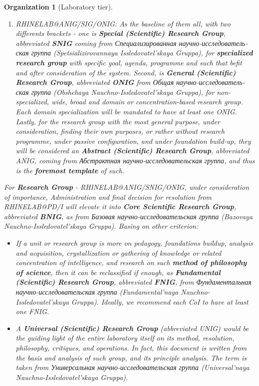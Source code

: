 \documentclass[10pt,a4paper]{article}
\newtheorem{org}{Organization}[section]
\begin{document}
\begin{org}[Laboratory tier]
\begin{enumerate}[topsep=1pt,itemsep=1pt]
        \item \textsf{RHINELAB@ANIG/SIG/ONIG}: As the baseline of them all, with two differents brackets - one is \textbf{Special (Scientific) Research Group}, abbreviated \textbf{SNIG} coming from \foreignlanguage{russian}{Специализированная научно-исследовательская группа} (Spetsializirovannaya Issledovatel'skaya Gruppa), for \textbf{specialized research group} with specific goal, agenda, programme and such that befit and after consideration of the system. Second, is \textbf{General (Scientific) Research Group}, abbreviated \textbf{ONIG} from \foreignlanguage{russian}{Общая научно-исследовательская группа} (Obshchaya Nauchno-Issledovatel'skaya Gruppa), for non-specialized, wide, broad and domain or concentration-based research group. Each domain specialization will be mandated to have at least one ONIG. Lastly, for the research group with the most general purpose, under consideration, finding their own purposes, or rather without research programme, under passive configuration, and under foundation build-up, they will be considered an \textbf{Abstract (Scientific) Research Group}, abbreviated ANIG, coming from \foreignlanguage{russian}{Абстрактная научно-исследовательская группа}, and thus is the \textbf{foremost template} of such. 
    \end{enumerate}
    For \textbf{Research Group} - \textsf{RHINELAB@ANIG/SNIG/ONIG}, under consideration of importance, Administration and final decision for resolution from \textsf{RHINELAB@PD/I} will elevate it into \textbf{Core Scientific Research Group}, abbreviated \textbf{BNIG}, as from \foreignlanguage{russian}{Базовая научно-исследовательская группа} (Bazovaya Nauchno-Issledovatel'skaya Gruppa). Basing on other criterion:
    \begin{itemize}
        \item If a unit or research group is more on pedagogy, foundations buildup, analysis and acquisition, crystallization or gathering of knowledge or related concentration of intelligence, and research on such \textbf{method of philosophy of science}, then it can be reclassified if enough, as \textbf{Fundamental (Scientific) Research Group}, abbreviated \textbf{FNIG}, from \foreignlanguage{russian}{Фундаментальная научно-исследовательская группа} (Fundamental'naya Nauchno-Issledovatel'skaya Gruppa). Ideally, we recommend each CoI to have at least one FNIG. 
        \item A \textbf{Universal (Scientific) Research Group} (abbreviated UNIG) would be the guiding light of the entire laboratory itself on its method, resolution, philosophy, critiques, and operations. In fact, this document is written from the basis and analysis of such group, and its principle analysis. The term is taken from \foreignlanguage{russian}{Универсальная научно-исследовательская группа} (Universal'naya Nauchno-Issledovatel'skaya Gruppa).

\end{itemize}
\end{org}
\end{document}
